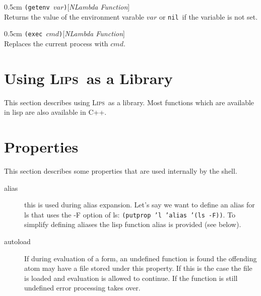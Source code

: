 \documentclass[a4paper]{article}
\newcommand{\lips}{\textsc{Lips}}
\newcommand{\lisp}[1]{\texttt{#1}}
\newcommand{\NIL}{\lisp{nil}}
\newenvironment{defun}[2]{\begin{adjustwidth}{0.5cm}{}
    {\hspace*{-0.5cm}\lisp{#2}\hfill[\textit{#1}]\\}}
               {\end{adjustwidth}}
\begin{document}
\begin{defun}{NLambda Function}{(getenv $var$)}
  Returns the value of the environment varable $var$ or \NIL\ if the
  variable is not set.
\end{defun}

\begin{defun}{NLambda Function}{(exec $cmd$)}
  Replaces the current process with $cmd$.
\end{defun}

\section{Using \lips\ as a Library}

This section describes using \lips\ as a library. Most functions which
are available in lisp are also available in \textsf{C++}.

\section{Properties}
This section describes some properties that are used internally by the
shell.

\begin{description}
\item[alias] this is used during alias expansion.  Let's say we want
  to define an alias for ls that uses the -F option of ls: \lisp{(putprop 'l
  'alias '(ls -F))}.  To simplify defining aliases the lisp function
  alias is provided (see below).
\item[autoload] If during evaluation of a form, an undefined function
  is found the offending atom may have a file stored under this
  property. If this is the case the file is loaded and evaluation is
  allowed to continue.  If the function is still undefined error
  processing takes over.
\end{description}
\end{document}
